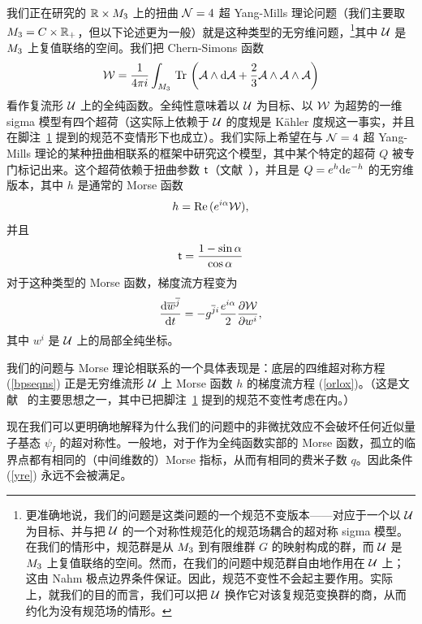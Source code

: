 我们正在研究的 ${\mathbb R}\times M_3$ 上的扭曲 ${\mathcal N}=4$ 超 Yang-Mills 理论问题（我们主要取 $M_3=C\times{\mathbb R}_+$，但以下论述更为一般）就是这种类型的无穷维问题，\footnote{\label{zort}
更准确地说，我们的问题是这类问题的一个规范不变版本——对应于一个以 ${\mathcal U}$ 为目标、并与把 ${\mathcal U}$ 的一个对称性规范化的规范场耦合的超对称 sigma 模型。在我们的情形中，规范群是从 $M_3$ 到有限维群 $G$ 的映射构成的群，而 ${\mathcal U}$ 是 $M_3$ 上复值联络的空间。然而，在我们的问题中规范群自由地作用在 ${\mathcal U}$ 上；这由 Nahm 极点边界条件保证。因此，规范不变性不会起主要作用。实际上，就我们的目的而言，我们可以把 ${\mathcal U}$ 换作它对该复规范变换群的商，从而约化为没有规范场的情形。}其中 ${\mathcal U}$ 是 $M_3$ 上复值联络的空间。我们把 Chern-Simons 函数
\begin{equation}\label{csfun}{\mathcal W}=\frac{1}{4\pi i }\int_{M_3}\,{\mathrm {Tr}}\,\left({\mathcal A}\wedge{\mathrm d} {\mathcal A}+\frac{2}{3}
{\mathcal A}\wedge{\mathcal A}\wedge{\mathcal A}\right)\end{equation}
看作复流形 ${\mathcal U}$ 上的全纯函数。全纯性意味着以 ${\mathcal U}$ 为目标、以 ${\mathcal W}$ 为超势的一维 sigma 模型有四个超荷（这实际上依赖于 ${\mathcal U}$ 的度规是 Kähler 度规这一事实，并且在脚注~\ref{zort} 提到的规范不变情形下也成立）。我们实际上希望在与 ${\mathcal N}=4$ 超 Yang-Mills 理论的某种扭曲相联系的框架中研究这个模型，其中某个特定的超荷 $Q$ 被专门标记出来。这个超荷依赖于扭曲参数 ${ \sf t}$（文献~\cite{KW}），并且是 $Q=e^h{\mathrm d} e^{-h}$ 的无穷维版本，其中 $h$ 是通常的 Morse 函数
\begin{equation}\label{morsefn}h=\mathrm{Re}\,(e^{i\alpha}{\mathcal W}),\end{equation}
并且
\begin{equation}\label{alphaq} { \sf t} = \frac{1- \sin \alpha}{\cos{\alpha} }\end{equation}
对于这种类型的 Morse 函数，梯度流方程变为
\begin{equation}\label{lphaq} \frac{{\mathrm d} \overline w^{\overline j}}{{\mathrm d} t}=-g^{\overline j i}\frac{e^{i\alpha}}{2}
\frac{\partial{\mathcal W}}{\partial w^i},\end{equation}
其中 $w^i$ 是 ${\mathcal U}$ 上的局部全纯坐标。


我们的问题与 Morse 理论相联系的一个具体表现是：底层的四维超对称方程 (\ref{bpseqns}) 正是无穷维流形 ${\mathcal U}$ 上 Morse 函数 $h$ 的梯度流方程 (\ref{orlox})。（这是文献~\cite{Analytic,NewLook} 的主要思想之一，其中已把脚注~\ref{zort} 提到的规范不变性考虑在内。）

现在我们可以更明确地解释为什么我们的问题中的非微扰效应不会破坏任何近似量子基态 $\psi_I$ 的超对称性。一般地，对于作为全纯函数实部的 Morse 函数，孤立的临界点都有相同的（中间维数的）Morse 指标，从而有相同的费米子数 $q$。因此条件 (\ref{yre}) 永远不会被满足。

